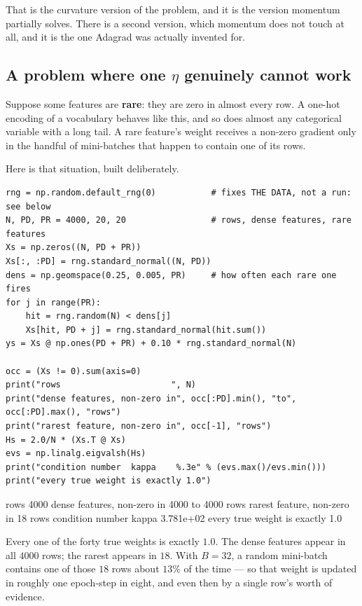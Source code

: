 \documentclass[11pt]{article}
\begin{document}
That is the curvature version of the problem, and it is the version momentum
partially solves. There is a second version, which momentum does not touch at
all, and it is the one Adagrad was actually invented for.

\subsection{A problem where one $\eta$ genuinely cannot work}
\label{sec:sparse}

Suppose some features are \textbf{rare}: they are zero in almost every row. A
one-hot encoding of a vocabulary behaves like this, and so does almost any
categorical variable with a long tail. A rare feature's weight receives a
non-zero gradient only in the handful of mini-batches that happen to contain
one of its rows.

Here is that situation, built deliberately.

\begin{lstlisting}
rng = np.random.default_rng(0)           # fixes THE DATA, not a run: see below
N, PD, PR = 4000, 20, 20                 # rows, dense features, rare features
Xs = np.zeros((N, PD + PR))
Xs[:, :PD] = rng.standard_normal((N, PD))
dens = np.geomspace(0.25, 0.005, PR)     # how often each rare one fires
for j in range(PR):
    hit = rng.random(N) < dens[j]
    Xs[hit, PD + j] = rng.standard_normal(hit.sum())
ys = Xs @ np.ones(PD + PR) + 0.10 * rng.standard_normal(N)

occ = (Xs != 0).sum(axis=0)
print("rows                      ", N)
print("dense features, non-zero in", occ[:PD].min(), "to", occ[:PD].max(), "rows")
print("rarest feature, non-zero in", occ[-1], "rows")
Hs = 2.0/N * (Xs.T @ Xs)
evs = np.linalg.eigvalsh(Hs)
print("condition number  kappa    %.3e" % (evs.max()/evs.min()))
print("every true weight is exactly 1.0")
\end{lstlisting}
\begin{codeout}
rows                       4000
dense features, non-zero in 4000 to 4000 rows
rarest feature, non-zero in 18 rows
condition number  kappa    3.781e+02
every true weight is exactly 1.0
\end{codeout}

Every one of the forty true weights is exactly $1.0$. The dense features appear
in all $4000$ rows; the rarest appears in $18$. With $B = 32$, a random
mini-batch contains one of those $18$ rows about $13\%$ of the time --- so that
weight is updated in roughly one epoch-step in eight, and even then by a single
row's worth of evidence.
\end{document}
